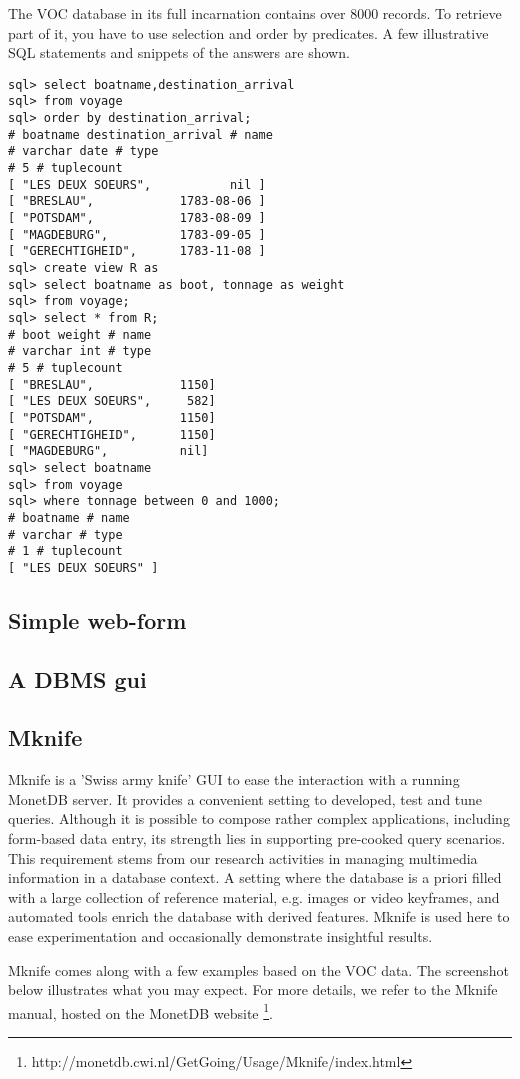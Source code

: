 \documentclass[10pt,twocolumn,fleqn]{article}
\begin{document}
The VOC database in its full incarnation contains over 8000
records. To retrieve part of it, you have to use selection and order
by predicates. A few illustrative SQL statements and snippets of
the answers are shown.
{\footnotesize
\begin{verbatim}
sql> select boatname,destination_arrival 
sql> from voyage 
sql> order by destination_arrival;
# boatname destination_arrival # name
# varchar date # type
# 5 # tuplecount
[ "LES DEUX SOEURS",           nil ]
[ "BRESLAU",            1783-08-06 ]
[ "POTSDAM",            1783-08-09 ]
[ "MAGDEBURG",          1783-09-05 ]
[ "GERECHTIGHEID",      1783-11-08 ]
sql> create view R as 
sql> select boatname as boot, tonnage as weight 
sql> from voyage;
sql> select * from R;
# boot weight # name
# varchar int # type
# 5 # tuplecount
[ "BRESLAU",            1150]
[ "LES DEUX SOEURS",     582]
[ "POTSDAM",            1150]
[ "GERECHTIGHEID",      1150]
[ "MAGDEBURG",          nil]
sql> select boatname 
sql> from voyage
sql> where tonnage between 0 and 1000;
# boatname # name
# varchar # type
# 1 # tuplecount
[ "LES DEUX SOEURS" ]
\end{verbatim}
}

\subsection{Simple web-form}
\label{form}
\subsection{A DBMS gui}
\label{ide}
\subsection{Mknife}
\label{mknife}
Mknife is a 'Swiss army knife' GUI to ease the interaction with a running 
MonetDB server. It provides a convenient setting to developed, test and 
tune queries. Although it is possible to compose rather complex applications,
including form-based data entry, its strength lies in supporting pre-cooked 
query scenarios. This requirement stems from our research activities in managing 
multimedia information in a database context. A setting where the database 
is a priori filled with a large collection of reference material, 
e.g. images or video keyframes, and automated tools enrich the database 
with derived features. Mknife is used here to ease experimentation and 
occasionally demonstrate insightful results.

Mknife comes along with a few examples based on the VOC
data. The screenshot below illustrates what you may expect.
For more details, we refer to the Mknife manual, hosted on
the
MonetDB website \footnote{http://monetdb.cwi.nl/GetGoing/Usage/Mknife/index.html}.
\end{document}
